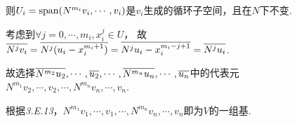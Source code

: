 则\(U_i=\mathrm{span}(N^{m_i}v_i,\cdots,v_i)\)是\(v_i\)生成的循环子空间，且在\(N\)下不变.

考虑到\(\forall j=0,\cdots,m_i,x_i^j \in U\)，
故\(\overline{N^jv_i}=\overline{N^j(u_i-x_i^{m_i+1})}=\overline{N^ju_i-x_i^{m_i-j+1}}=\overline{N^ju_i}\).

故选择\(\overline{N^{m_2}u_2},\cdots,\overline{u_2},\cdots,\overline{N^{m_n}u_n},\cdots,\overline{u_n}\)中的代表元
\(N^{m_1}v_2,\cdots,v_2,\cdots,N^{m_n}v_n,\cdots,v_n\).

根据\textit{3.E.13}，\(N^{m_1}v_1,\cdots,v_1,\cdots,N^{m_n}v_n,\cdots,v_n\)即为\(V\)的一组基.


